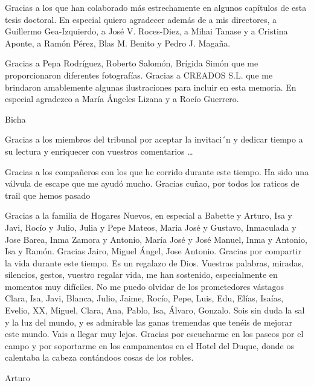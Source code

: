 Gracias a los que han colaborado más estrechamente en algunos capítulos de esta tesis doctoral. En especial quiero agradecer además de a mis directores, a Guillermo Gea-Izquierdo, a José V. Roces-Diez, a Mihai Tanase y a Cristina Aponte, a Ramón Pérez, Blas M. Benito y Pedro J. Magaña. 


Gracias a  Pepa Rodríguez, Roberto Salomón, Brígida Simón que me proporcionaron diferentes fotografías. Gracias a CREADOS S.L. que me brindaron amablemente algunas ilustraciones para incluir en esta memoria. En especial agradezco a María Ángeles Lizana y a Rocío Guerrero. 

Bicha

Gracias a los miembros del tribunal por aceptar la invitaci´n y dedicar tiempo a su lectura y enriquecer con vuestros comentarios … 

Gracias a los compañeros con los que he corrido durante este tiempo. Ha sido una válvula de escape que me ayudó mucho. Gracias cuñao, por todos los raticos de trail que hemos pasado

Gracias a la familia de Hogares Nuevos, en especial a Babette y Arturo, Isa y Javi, Rocío y Julio, Julia y Pepe Mateos, Maria José y Gustavo, Inmaculada y Jose Barea, Inma Zamora y Antonio, María José y José Manuel, Inma y Antonio, Isa y Ramón. Gracias Jairo, Miguel Ángel, Jose Antonio. Gracias por compartir la vida durante este tiempo. Es un regalazo de Dios. Vuestras palabras, miradas, silencios, gestos, vuestro regalar vida, me han sostenido, especialmente en momentos muy difíciles. No me puedo olvidar de los prometedores vástagos Clara, Isa, Javi, Blanca, Julio, Jaime, Rocío, Pepe, Luis, Edu, Elías, Isaías, Evelio, XX, Miguel, Clara, Ana, Pablo, Isa, Álvaro, Gonzalo. Sois sin duda la sal y la luz del mundo, y es admirable las ganas tremendas que tenéis de mejorar este mundo. Vais a llegar muy lejos. Gracias por escucharme en los paseos por el campo y por soportarme en los campamentos en el Hotel del Duque, donde os calentaba la cabeza contándoos cosas de los robles.  



Arturo

